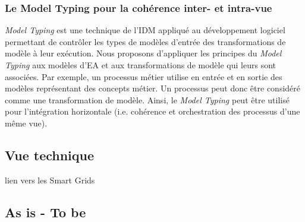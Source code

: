 \subsubsection{Le Model Typing pour la cohérence inter- et intra-vue}

\textit{Model Typing} est une technique de l'IDM appliqué au développement
logiciel permettant de contrôler les types de modèles d'entrée des
transformations de modèle à leur exécution. Nous proposons d'appliquer les
principes du \textit{Model Typing} aux modèles d'EA et aux transformations de
modèle qui leurs sont associées. Par exemple, un processus métier utilise en
entrée et en sortie des modèles représentant des concepts métier. Un processus
peut donc être considéré comme une transformation de modèle. Ainsi, le
\textit{Model Typing} peut être utilisé pour l'intégration horizontale (i.e.
cohérence et orchestration des processus d'une même vue).



    \subsection{Vue technique}
    lien vers les Smart Grids
    
    \subsection{As is - To be}

